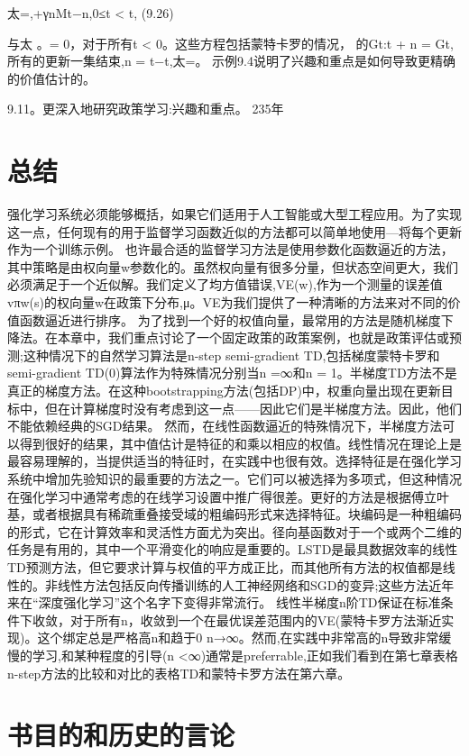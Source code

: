 {太=,+γnMt−n,0≤t < t, 					(9.26)

与太
。= 0，对于所有t < 0。这些方程包括蒙特卡罗的情况，
的Gt:t + n = Gt,所有的更新一集结束,n = t−t,太=。
示例9.4说明了兴趣和重点是如何导致更精确的价值估计的。

9.11。更深入地研究政策学习:兴趣和重点。 					235年

\section{总结}
强化学习系统必须能够概括，如果它们适用于人工智能或大型工程应用。为了实现这一点，任何现有的用于监督学习函数近似的方法都可以简单地使用—将每个更新作为一个训练示例。
也许最合适的监督学习方法是使用参数化函数逼近的方法，其中策略是由权向量w参数化的。虽然权向量有很多分量，但状态空间更大，我们必须满足于一个近似解。我们定义了均方值错误,VE(w),作为一个测量的误差值vπw(s)的权向量w在政策下分布,μ。VE为我们提供了一种清晰的方法来对不同的价值函数逼近进行排序。
为了找到一个好的权值向量，最常用的方法是随机梯度下降法。在本章中，我们重点讨论了一个固定政策的政策案例，也就是政策评估或预测;这种情况下的自然学习算法是n-step semi-gradient TD,包括梯度蒙特卡罗和semi-gradient TD(0)算法作为特殊情况分别当n =∞和n = 1。半梯度TD方法不是真正的梯度方法。在这种bootstrapping方法(包括DP)中，权重向量出现在更新目标中，但在计算梯度时没有考虑到这一点——因此它们是半梯度方法。因此，他们不能依赖经典的SGD结果。
然而，在线性函数逼近的特殊情况下，半梯度方法可以得到很好的结果，其中值估计是特征的和乘以相应的权值。线性情况在理论上是最容易理解的，当提供适当的特征时，在实践中也很有效。选择特征是在强化学习系统中增加先验知识的最重要的方法之一。它们可以被选择为多项式，但这种情况在强化学习中通常考虑的在线学习设置中推广得很差。更好的方法是根据傅立叶基，或者根据具有稀疏重叠接受域的粗编码形式来选择特征。块编码是一种粗编码的形式，它在计算效率和灵活性方面尤为突出。径向基函数对于一个或两个二维的任务是有用的，其中一个平滑变化的响应是重要的。LSTD是最具数据效率的线性TD预测方法，但它要求计算与权值的平方成正比，而其他所有方法的权值都是线性的。非线性方法包括反向传播训练的人工神经网络和SGD的变异;这些方法近年来在“深度强化学习”这个名字下变得非常流行。
线性半梯度n阶TD保证在标准条件下收敛，对于所有n，收敛到一个在最优误差范围内的VE(蒙特卡罗方法渐近实现)。这个绑定总是严格高n和趋于0 n→∞。然而,在实践中非常高的n导致非常缓慢的学习,和某种程度的引导(n <∞)通常是preferrable,正如我们看到在第七章表格n-step方法的比较和对比的表格TD和蒙特卡罗方法在第六章。

\section{书目的和历史的言论}

}
